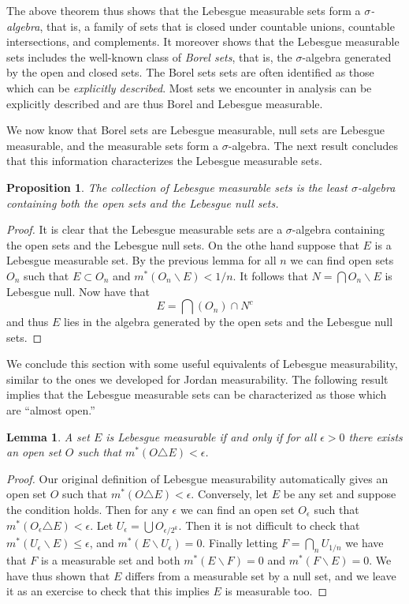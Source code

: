 \documentclass[11pt,oneside]{amsbook}
\renewcommand{\setminus}{\smallsetminus}
\theoremstyle{definition}
\theoremstyle{plain}
\newtheorem{lem}[thm]{Lemma}
\newtheorem{prop}[thm]{Proposition}
\theoremstyle{definition}
\theoremstyle{remark}
\numberwithin{equation}{section}
\numberwithin{figure}{section}
\begin{document}
The above theorem thus shows that the Lebesgue measurable sets form a \emph{$\sigma$-algebra}, that is, a family of sets that is closed under countable unions, countable intersections, and complements. It moreover shows that the Lebesgue measurable sets includes the well-known class of \emph{Borel sets}, that is, the $\sigma$-algebra generated by the open and closed sets. The Borel sets sets are often identified as those which can be \emph{explicitly described}. Most sets we encounter in analysis can be explicitly described and are thus Borel and Lebesgue measurable.

We now know that Borel sets are Lebesgue measurable, null sets are Lebesgue measurable, and the measurable sets form a $\sigma$-algebra. The next result concludes that this information characterizes the Lebesgue measurable sets.

\begin{prop}
  The collection of Lebesgue measurable sets is the least $\sigma$-algebra containing both the open sets and the Lebesgue null sets.
\end{prop}

\begin{proof}
  It is clear that the Lebesgue measurable sets are a $\sigma$-algebra containing the open sets and the Lebesgue null sets. On the othe hand suppose that $E$ is a Lebesgue measurable set. By the previous lemma for all $n$ we can find open sets $O_n$ such that $E\subset O_n$ and $m^*(O_n\setminus E)<1/n$. It follows that $N=\bigcap O_n\setminus E$ is Lebesgue null. Now have that
  \[E=\bigcap(O_n)\cap N^c
  \]
  and thus $E$ lies in the algebra generated by the open sets and the Lebesgue null sets.
\end{proof}

We conclude this section with some useful equivalents of Lebesgue measurability, similar to the ones we developed for Jordan measurability. The following result implies that the Lebesgue measurable sets can be characterized as those which are ``almost open.''

\begin{lem}
  A set $E$ is Lebesgue measurable if and only if for all $\epsilon>0$ there exists an open set $O$ such that $m^*(O\triangle E)<\epsilon$.
\end{lem}

\begin{proof}
  Our original definition of Lebesgue measurability automatically gives an open set $O$ such that $m^*(O\triangle E)<\epsilon$. Conversely, let $E$ be any set and suppose the condition holds. Then for any $\epsilon$ we can find an open set $O_\epsilon$ such that $m^*(O_\epsilon\triangle E)<\epsilon$. Let $U_\epsilon=\bigcup O_{\epsilon/2^k}$. Then it is not difficult to check that $m^*(U_\epsilon\setminus E)\leq\epsilon$, and $m^*(E\setminus U_\epsilon)=0$. Finally letting $F=\bigcap_nU_{1/n}$ we have that $F$ is a measurable set and both $m^*(E\setminus F)=0$ and $m^*(F\smallsetminus E)=0$. We have thus shown that $E$ differs from a measurable set by a null set, and we leave it as an exercise to check that this implies $E$ is measurable too.
\end{proof}
\end{document}

